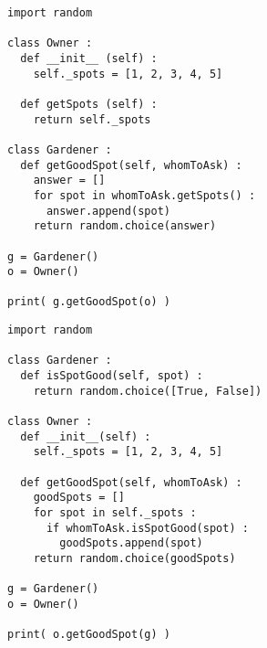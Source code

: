 \begin{frame}[fragile]
%
\begin{tcbraster}[raster columns=2,
                  raster equal height,
                  nobeforeafter,
                  raster column skip=0.5cm]
\begin{codebox}
\begin{verbatim}
import random

class Owner :
  def __init__ (self) :
    self._spots = [1, 2, 3, 4, 5]
  
  def getSpots (self) :
    return self._spots

class Gardener :
  def getGoodSpot(self, whomToAsk) :
    answer = []
    for spot in whomToAsk.getSpots() :
      answer.append(spot)
    return random.choice(answer)

g = Gardener()
o = Owner()

print( g.getGoodSpot(o) )
\end{verbatim}
\end{codebox}
%
\begin{codebox}
\begin{verbatim}
import random

class Gardener :
  def isSpotGood(self, spot) :
    return random.choice([True, False])

class Owner :
  def __init__(self) :
    self._spots = [1, 2, 3, 4, 5]
  
  def getGoodSpot(self, whomToAsk) :
    goodSpots = []
    for spot in self._spots :
      if whomToAsk.isSpotGood(spot) :
        goodSpots.append(spot)
    return random.choice(goodSpots)
    
g = Gardener()
o = Owner()

print( o.getGoodSpot(g) )
\end{verbatim}
\end{codebox}
\end{tcbraster}
%
\end{frame}


